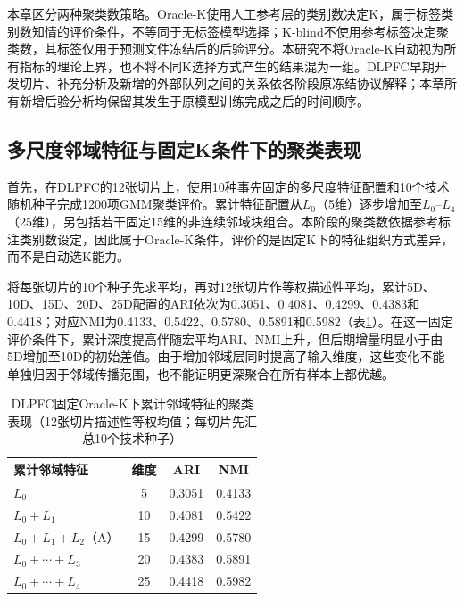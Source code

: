 本章区分两种聚类数策略。Oracle-K使用人工参考层的类别数决定K，属于标签类别数知情的评价条件，不等同于无标签模型选择；K-blind不使用参考标签决定聚类数，其标签仅用于预测文件冻结后的后验评分。本研究不将Oracle-K自动视为所有指标的理论上界，也不将不同K选择方式产生的结果混为一组。DLPFC早期开发切片、补充分析及新增的外部队列之间的关系依各阶段原冻结协议解释；本章所有新增后验分析均保留其发生于原模型训练完成之后的时间顺序。

\subsection{多尺度邻域特征与固定K条件下的聚类表现}
\label{subsec:cellcharter-e1e2-v1}

首先，在DLPFC的12张切片上，使用10种事先固定的多尺度特征配置和10个技术随机种子完成1200项GMM聚类评价。累计特征配置从$L_0$（5维）逐步增加至$L_0$--$L_4$（25维），另包括若干固定15维的非连续邻域块组合。本阶段的聚类数依据参考标注类别数设定，因此属于Oracle-K条件，评价的是固定K下的特征组织方式差异，而不是自动选K能力。

将每张切片的10个种子先求平均，再对12张切片作等权描述性平均，累计5D、10D、15D、20D、25D配置的ARI依次为0.3051、0.4081、0.4299、0.4383和0.4418；对应NMI为0.4133、0.5422、0.5780、0.5891和0.5982（表\ref{tab:cellcharter-e1e2-depth-v1}）。在这一固定评价条件下，累计深度提高伴随宏平均ARI、NMI上升，但后期增量明显小于由5D增加至10D的初始差值。由于增加邻域层同时提高了输入维度，这些变化不能单独归因于邻域传播范围，也不能证明更深聚合在所有样本上都优越。

\begin{table}[htbp]
\centering
\caption{DLPFC固定Oracle-K下累计邻域特征的聚类表现（12张切片描述性等权均值；每切片先汇总10个技术种子）}
\label{tab:cellcharter-e1e2-depth-v1}
\begin{tabular}{lccc}
\toprule
累计邻域特征 & 维度 & ARI & NMI\\
\midrule
$L_0$ & 5 & 0.3051 & 0.4133\\
$L_0+L_1$ & 10 & 0.4081 & 0.5422\\
$L_0+L_1+L_2$（A） & 15 & 0.4299 & 0.5780\\
$L_0+\cdots+L_3$ & 20 & 0.4383 & 0.5891\\
$L_0+\cdots+L_4$ & 25 & 0.4418 & 0.5982\\
\bottomrule
\end{tabular}
\end{table}

